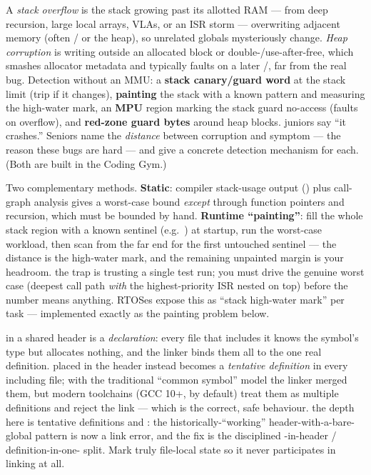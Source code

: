 A \emph{stack overflow} is the stack growing past its allotted RAM --- from
deep recursion, large local arrays, VLAs, or an ISR storm --- overwriting
adjacent memory (often / or the heap), so unrelated
globals mysteriously change. \emph{Heap corruption} is writing outside an
allocated block or double-/use-after-free, which smashes allocator metadata and
typically faults on a later /, far from the real bug.
Detection without an MMU: a \textbf{stack canary/guard word} at the stack
limit (trip if it changes), \textbf{painting} the stack with a known pattern
and measuring the high-water mark, an \textbf{MPU} region marking the stack
guard no-access (faults on overflow), and \textbf{red-zone guard bytes} around
heap blocks. \trap juniors say ``it crashes.'' Seniors name the \emph{distance}
between corruption and symptom --- the reason these bugs are hard --- and give
a concrete detection mechanism for each. (Both are built in the Coding Gym.)

Two complementary methods. \textbf{Static}: compiler stack-usage output
() plus call-graph analysis gives a worst-case bound
\emph{except} through function pointers and recursion, which must be bounded by
hand. \textbf{Runtime ``painting''}: fill the whole stack region with a known
sentinel (e.g.\ ) at startup, run the worst-case workload, then scan
from the far end for the first untouched sentinel --- the distance is the
high-water mark, and the remaining unpainted margin is your headroom. \trap the
trap is trusting a single test run; you must drive the genuine worst case
(deepest call path \emph{with} the highest-priority ISR nested on top) before
the number means anything. RTOSes expose this as ``stack high-water mark'' per
task --- implemented exactly as the painting problem below.

 in a shared header is a \emph{declaration}: every
file that includes it knows the symbol's type but allocates nothing, and the
linker binds them all to the one real definition.  placed
in the header instead becomes a \emph{tentative definition} in every including
file; with the traditional ``common symbol'' model the linker merged them, but
modern toolchains (GCC 10+,  by default) treat them as
multiple definitions and reject the link --- which is the correct, safe
behaviour. \trap the depth here is tentative definitions and :
the historically-``working'' header-with-a-bare-global pattern is now a link
error, and the fix is the disciplined -in-header /
definition-in-one- split. Mark truly file-local state  so
it never participates in linking at all.

